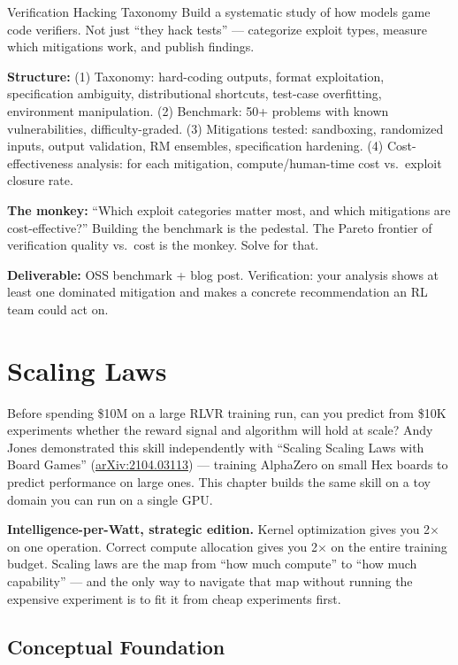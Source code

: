 \begin{portfolio}{Verification Hacking Taxonomy}
Build a systematic study of how models game code verifiers. Not just ``they hack tests'' --- categorize exploit types, measure which mitigations work, and publish findings.

\textbf{Structure:} (1) Taxonomy: hard-coding outputs, format exploitation, specification ambiguity, distributional shortcuts, test-case overfitting, environment manipulation. (2) Benchmark: 50+ problems with known vulnerabilities, difficulty-graded. (3) Mitigations tested: sandboxing, randomized inputs, output validation, RM ensembles, specification hardening. (4) Cost-effectiveness analysis: for each mitigation, compute/human-time cost vs.\ exploit closure rate.

\textbf{The monkey:} ``Which exploit categories matter most, and which mitigations are cost-effective?'' Building the benchmark is the pedestal. The Pareto frontier of verification quality vs.\ cost is the monkey. Solve for that.

\textbf{Deliverable:} OSS benchmark + blog post. Verification: your analysis shows at least one dominated mitigation and makes a concrete recommendation an RL team could act on.
\end{portfolio}

\newpage
\section{Scaling Laws}

\smallskip

Before spending \$10M on a large RLVR training run, can you predict from \$10K experiments whether the reward signal and algorithm will hold at scale? Andy Jones demonstrated this skill independently with ``Scaling Scaling Laws with Board Games'' (\href{https://arxiv.org/abs/2104.03113}{arXiv:2104.03113}) --- training AlphaZero on small Hex boards to predict performance on large ones. This chapter builds the same skill on a toy domain you can run on a single GPU.

\textbf{Intelligence-per-Watt, strategic edition.} Kernel optimization gives you 2$\times$ on one operation. Correct compute allocation gives you 2$\times$ on the entire training budget. Scaling laws are the map from ``how much compute'' to ``how much capability'' --- and the only way to navigate that map without running the expensive experiment is to fit it from cheap experiments first.

\subsection{Conceptual Foundation}

